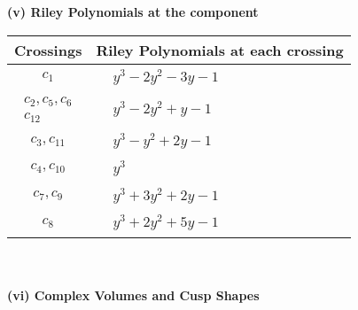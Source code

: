 \documentclass[1p]{elsarticle_modified}
\theoremstyle{definition}
\begin{document}
\newpage\renewcommand{\arraystretch}{1}
\flushleft \textbf{(v) Riley Polynomials at the component}\newline \\
\begin{tabular}{m{50pt}|m{274pt}}
Crossings & \hspace{64pt}Riley Polynomials at each crossing \\
\hline $$\begin{aligned}c_{1}\end{aligned}$$&$\begin{aligned}
&y^3-2 y^2-3 y-1
\end{aligned}$\\
\hline $$\begin{aligned}c_{2},c_{5},c_{6}\\c_{12}\end{aligned}$$&$\begin{aligned}
&y^3-2 y^2+y-1
\end{aligned}$\\
\hline $$\begin{aligned}c_{3},c_{11}\end{aligned}$$&$\begin{aligned}
&y^3- y^2+2 y-1
\end{aligned}$\\
\hline $$\begin{aligned}c_{4},c_{10}\end{aligned}$$&$\begin{aligned}
&y^3
\end{aligned}$\\
\hline $$\begin{aligned}c_{7},c_{9}\end{aligned}$$&$\begin{aligned}
&y^3+3 y^2+2 y-1
\end{aligned}$\\
\hline $$\begin{aligned}c_{8}\end{aligned}$$&$\begin{aligned}
&y^3+2 y^2+5 y-1
\end{aligned}$\\
\hline
\end{tabular}\\~\\
\newpage\flushleft \textbf{(vi) Complex Volumes and Cusp Shapes}
\end{document}
